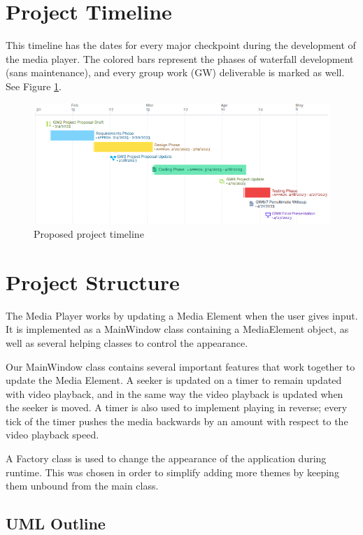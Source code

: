 \documentclass[10pt,conference,onecolumn,compsoc]{IEEEtran}
\begin{document}
\clearpage
\section{Project Timeline}
This timeline has the dates for every major checkpoint during the development of the media player. The colored bars represent the phases of waterfall development (sans maintenance), and every group work (GW) deliverable is marked as well.
See Figure \ref{timeline}.

\begin{figure}[H]
\begin{center}
\includegraphics[scale=1.5]{Project_Timeline.png}
\caption{Proposed project timeline}
\label{timeline}
\end{center}
\end{figure}

\section{Project Structure}
The Media Player works by updating a Media Element when the user gives input. It is implemented as a MainWindow class containing a MediaElement object, as well as several helping classes to control the appearance. \medskip

Our MainWindow class contains several important features that work together to update the Media Element. A seeker is updated on a timer to remain updated with video playback, and in the same way the video playback is updated when the seeker is moved. A timer is also used to implement playing in reverse; every tick of the timer pushes the media backwards by an amount with respect to the video playback speed.   \par
A Factory class is used to change the appearance of the application during runtime. This was chosen in order to simplify adding more themes by keeping them unbound from the main class.

\subsection{UML Outline}
\end{document}
